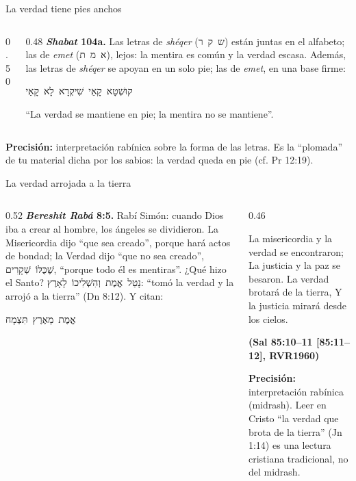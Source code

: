 \documentclass[hyperref={bookmarks=false},aspectratio=169]{beamer}
\newcommand{\heb}[1]{\mbox{\foreignlanguage{hebrew}{#1}}}
\newcommand{\fuente}[1]{\par\hfill{\upshape\bfseries\footnotesize\textcolor{azul}{#1}}}
\newcommand{\precision}[1]{{\footnotesize\color{gris}\textbf{Precisión:} #1}}
\begin{document}
\begin{frame}{La verdad tiene pies anchos}
\begin{columns}[c,onlytextwidth]
\begin{column}{0.50\textwidth}
\centering
{}
\end{column}
\begin{column}{0.48\textwidth}\small
\textbf{\emph{Shabat} 104a.} Las letras de \emph{shéqer} (\heb{ש ק ר}) están juntas en el alfabeto; las de \emph{emet} (\heb{א מ ת}), lejos: la mentira es común y la verdad escasa. Además, las letras de \emph{shéqer} se apoyan en un solo pie; las de \emph{emet}, en una base firme:
\begin{center}\heb{קוּשְׁטָא קָאֵי שִׁיקְרָא לָא קָאֵי}\end{center}
``La verdad se mantiene en pie; la mentira no se mantiene''.
\end{column}
\end{columns}\par\medskip
\precision{interpretación rabínica sobre la forma de las letras. Es la ``plomada'' de tu material dicha por los sabios: la verdad queda en pie (cf. Pr 12:19).}
\end{frame}

\begin{frame}{La verdad arrojada a la tierra}
\begin{columns}[t,onlytextwidth]
\begin{column}{0.52\textwidth}\small
\textbf{\emph{Bereshit Rabá} 8:5.} Rabí Simón: cuando Dios iba a crear al hombre, los ángeles se dividieron. La Misericordia dijo ``que sea creado'', porque hará actos de bondad; la Verdad dijo ``que no sea creado'', \heb{שֶׁכֻּלּוֹ שְׁקָרִים}, ``porque todo él es mentiras''. ¿Qué hizo el Santo? \heb{נָטַל אֱמֶת וְהִשְׁלִיכוֹ לָאָרֶץ}: ``tomó la verdad y la arrojó a la tierra'' (Dn 8:12). Y citan:
\begin{center}\heb{אֱמֶת מֵאֶרֶץ תִּצְמָח}\end{center}
\end{column}
\begin{column}{0.46\textwidth}
\begin{cita}La misericordia y la verdad se encontraron; La justicia y la paz se besaron. La verdad brotará de la tierra, Y la justicia mirará desde los cielos.\fuente{(Sal 85:10--11 [85:11--12], RVR1960)}\end{cita}
\precision{interpretación rabínica (midrash). Leer en Cristo ``la verdad que brota de la tierra'' (Jn 1:14) es una lectura cristiana tradicional, no del midrash.}
\end{column}
\end{columns}
\end{frame}
\end{document}
